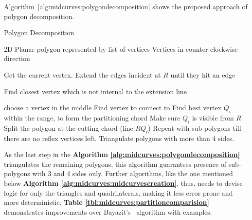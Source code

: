 %
%

Algorithm~\ref{alg:midcurves:polygondecomposition} shows the proposed approach of polygon decomposition. 

\bigskip

\begin{algorithm}[H]
	\caption{Polygon Decomposition}
	\label{alg:midcurves:polygondecomposition}
	\begin{algorithmic}[1]
		\REQUIRE 2D Planar polygon represented by list of vertices
		\ENSURE Vertices in counter-clockwise direction

			\STATE Get the current vertex.
				\STATE Extend  the  edges incident at $R$ until they hit an edge

					\STATE Find closest vertex which is not internal to the extension line
				\ENDIF

					\STATE choose a vertex in the middle
				\ELSE
					\STATE Find vertex to connect to
					\STATE Find best vertex $Q_i$ within the range, to form the partitioning chord
					\STATE Make sure $Q_i$ is visible from $R$
				\ENDIF
			\ENDIF
		\ENDWHILE
		\STATE  Split the polygon at the cutting chord (line $RQ_i$)
		\STATE Repeat with sub-polygons till there are no reflex vertices left. 
		\STATE Triangulate polygons with more than 4 sides.
	\end{algorithmic}
\end{algorithm}


As the last step in the {\bf Algorithm \ref{alg:midcurves:polygondecomposition}} triangulates the remaining polygons, this algorithm guarantees presence of sub-polygons with 3 and 4 sides only. Further algorithms, like the one mentioned below {\bf Algorithm \ref{alg:midcurves:midcurvescreation}}, thus, needs to devise logic for only the triangles and quadrilaterals, making it less error prone and more deterministic. {\bf Table \ref{tbl:midcurves:partitioncomparision}} demonstrates improvements over Bayazit's~\cite{Bayazit} algorithm with examples.  


